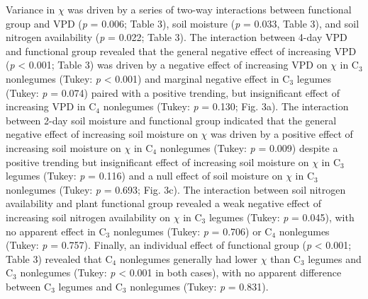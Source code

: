 Variance in $\chi$ was driven by a series of two-way interactions between functional group and VPD (\textit{p} = 0.006; Table 3), soil moisture (\textit{p} = 0.033, Table 3), and soil nitrogen availability (\textit{p} = 0.022; Table 3). The interaction between 4-day VPD and functional group revealed that the general negative effect of increasing VPD (\textit{p} < 0.001; Table 3) was driven by a negative effect of increasing VPD on $\chi$ in C$_3$ nonlegumes (Tukey: \textit{p} < 0.001) and marginal negative effect in C$_3$ legumes (Tukey: \textit{p} = 0.074) paired with a positive trending, but insignificant effect of increasing VPD in C$_4$ nonlegumes (Tukey: \textit{p} = 0.130; Fig. 3a). The interaction between 2-day soil moisture and functional group indicated that the general negative effect of increasing soil moisture on $\chi$ was driven by a positive effect of increasing soil moisture on $\chi$ in C$_4$ nonlegumes (Tukey: \textit{p} = 0.009) despite a positive trending but insignificant effect of increasing soil moisture on $\chi$ in C$_3$ legumes (Tukey: \textit{p} = 0.116) and a null effect of soil moisture on $\chi$ in C$_3$ nonlegumes (Tukey: \textit{p} = 0.693; Fig. 3c). The interaction between soil nitrogen availability and plant functional group revealed a weak negative effect of increasing soil nitrogen availability on $\chi$ in C$_3$ legumes (Tukey: \textit{p} = 0.045), with no apparent effect in C$_3$ nonlegumes (Tukey: \textit{p} = 0.706) or C$_4$ nonlegumes (Tukey: \textit{p} = 0.757). Finally, an individual effect of functional group (\textit{p} < 0.001; Table 3) revealed that C$_4$ nonlegumes generally had lower $\chi$ than C$_3$ legumes and C$_3$ nonlegumes (Tukey: \textit{p} < 0.001 in both cases), with no apparent difference between C$_3$ legumes and C$_3$ nonlegumes (Tukey: \textit{p} = 0.831).

